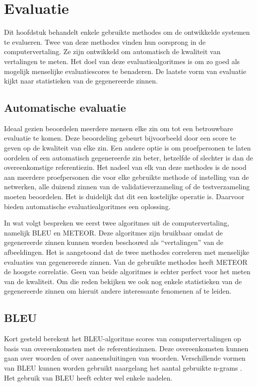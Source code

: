 \chapter{Evaluatie}
\label{hoofdstuk:evaluatie}
Dit hoofdstuk behandelt enkele gebruikte methodes om de ontwikkelde systemen te evalueren. Twee van deze methodes vinden hun oorsprong in de computervertaling. Ze zijn ontwikkeld om automatisch de kwaliteit van vertalingen te meten. Het doel van deze evaluatiealgoritmes is om zo goed als mogelijk menselijke evaluatiescores te benaderen. De laatste vorm van evaluatie kijkt naar statistieken van de gegenereerde zinnen.


\section{Automatische evaluatie}
Ideaal gezien beoordelen meerdere mensen elke zin om tot een betrouwbare evaluatie te komen. Deze beoordeling gebeurt bijvoorbeeld door een score te geven op de kwaliteit van elke zin. Een andere optie is om proefpersonen te laten oordelen of een automatisch gegenereerde zin beter, hetzelfde of slechter is dan de overeenkomstige referentiezin. Het nadeel van elk van deze methodes is de nood aan meerdere proefpersonen die voor elke gebruikte methode of instelling van de netwerken, alle duizend zinnen van de validatieverzameling of de testverzameling moeten beoordelen. Het is duidelijk dat dit een kostelijke operatie is. Daarvoor bieden automatische evaluatiealgoritmes een oplossing.

In wat volgt bespreken we eerst twee algoritmes uit de computervertaling, namelijk BLEU en METEOR.  Deze algoritmes zijn bruikbaar omdat de gegenereerde zinnen kunnen worden beschouwd als ``vertalingen'' van de afbeeldingen. Het is aangetoond dat de twee methodes correleren met menselijke evaluaties van gegenereerde zinnen. Van de gebruikte methodes heeft METEOR de hoogste correlatie. 
Geen van beide algoritmes is echter perfect voor het meten van de kwaliteit.
Om die reden bekijken we ook nog enkele statistieken van de gegenereerde zinnen om hieruit andere interessante fenomenen af te leiden.

\section{BLEU}
Kort gesteld berekent het BLEU-algoritme scores van computervertalingen op basis van overeenkomsten met de referentiezinnen. Deze overeenkomsten kunnen gaan over woorden of over aaneensluitingen van woorden. Verschillende vormen van BLEU kunnen worden gebruikt naargelang het aantal gebruikte n-grams . Het gebruik van BLEU heeft echter wel enkele nadelen.

